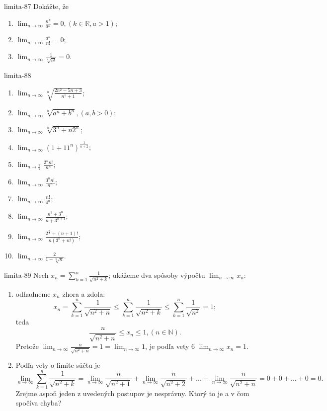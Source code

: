 \begin{defproblem}{limita-87}
Dokážte, že
\begin{enumerate}
\item $\lim_{n \rightarrow \infty} \frac{n^k}{a^n}=0,(k \in \mathbb{R},a>1)$;
\item $\lim_{n \rightarrow \infty} \frac{a^n}{n!}=0$;
\item $\lim_{n \rightarrow \infty} \frac{1}{\sqrt[n]{n!}}=0$.
\end{enumerate}
\end{defproblem}

\begin{defproblem}{limita-88}
\begin{multicols}{2}
\begin{enumerate}
    \item $\lim_{n \rightarrow \infty} \sqrt[n]{\frac{2n^2-5n+3}{n^5+1}}$;
    \item $\lim_{n \rightarrow \infty} \sqrt[n]{a^n+b^n},(a,b>0)$;
    \item $\lim_{n \rightarrow \infty} \sqrt[n]{3^n+n2^n}$;
    \item $\lim_{n \rightarrow \infty} (1+11^n)^{\frac{1}{n+2}}$;
    \item $\lim_{n \rightarrow \frac{\pi}{2}} \frac{2^nn!}{n^n}$;
    \item $\lim_{n \rightarrow \infty} \frac{3^nn!}{n^n}$;
    \item $\lim_{n \rightarrow \infty} \frac{n!}{4^n}$;
    \item $\lim_{n \rightarrow \infty} \frac{n^3+3^n}{n+3^{n+1}}$;
    \item $\lim_{n \rightarrow \infty} \frac{2^{\frac{n}{2}}+(n+1)!}{n(3^n+n!)}$;
    \item $\lim_{n \rightarrow \infty} \frac{2}{1-\sqrt[n]{n}}$.
\end{enumerate}
\end{multicols}
\end{defproblem}

\begin{defproblem}{limita-89}
Nech $x_n=\sum_{k=1}^n \frac{1}{\sqrt{n^2+k}}$; ukážeme dva spôsoby výpočtu $\lim_{n \rightarrow \infty} x_n:$
\begin{enumerate}
\item odhadneme $x_n$ zhora a zdola:
$$x_n=\sum_{k=1}^n \frac{1}{\sqrt{n^2+n}}\leq \sum_{k=1}^n \frac{1}{\sqrt{n^2+k}}\leq \sum_{k=1}^n \frac{1}{\sqrt{n^2}}=1;$$
teda $$\frac{n}{\sqrt{n^2+n}}\leq x_n \leq 1, (n \in \mathbb{N}).$$
Pretože $\lim_{n \rightarrow \infty} \frac{n}{\sqrt{n^2+n}}=1=\lim_{n \rightarrow \infty} 1$, je podľa vety $6$ $\lim_{n \rightarrow \infty} x_n=1$.
\item Podľa vety o limite súčtu je 
$$\lim_{n \rightarrow \infty} \sum_{k=1}^n \frac{1}{\sqrt{n^2+k}}=\lim_{n \rightarrow \infty} \frac{n}{\sqrt{n^2+1}}+\lim_{n \rightarrow \infty} \frac{n}{\sqrt{n^2+2}}+...+\lim_{n \rightarrow \infty} \frac{n}{\sqrt{n^2+n}}=0+0+...+0=0.$$
Zrejme aspoň jeden z uvedených postupov je nesprávny. Ktorý to je a v čom spočíva chyba?
\end{enumerate}
\end{defproblem}

